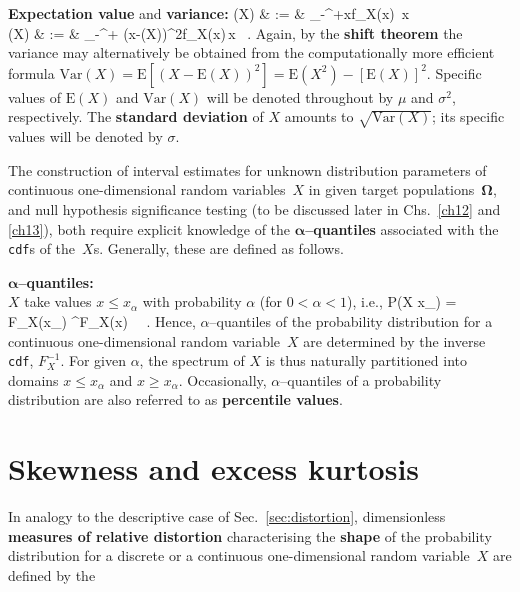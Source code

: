 \medskip
\noindent
\textbf{Expectation value} and \textbf{variance:}
%
\bea
{}
(X) & := & \int_{-\infty}^{+\infty}xf_{X}(x)\,
x \\
%
(X) & := & \int_{-\infty}^{+\infty}
\left(x-(X)\right)^{2}f_{X}(x)\,x \ .
\eea
%
Again, by the \textbf{shift theorem} the variance may alternatively 
be obtained from the computationally more efficient formula 
$\displaystyle \mathrm{Var}(X)=\mathrm{E}
\left[(X-\mathrm{E}(X))^{2}\right]
=\mathrm{E}(X^{2})-\left[\mathrm{E}(X)\right]^{2}$. Specific values
of $\mathrm{E}(X)$ and $\mathrm{Var}(X)$ will be denoted throughout
by $\mu$ and $\sigma^{2}$, respectively. The \textbf{standard
deviation} of $X$ amounts to $\sqrt{\mathrm{Var}(X)}$; its specific
values will be denoted by $\sigma$.

\medskip
\noindent
The construction of interval estimates for unknown distribution 
parameters of continuous one-dimensional random variables~$X$ in 
given target populations~$\boldsymbol{\Omega}$, and null hypothesis
significance testing (to be discussed later in 
Chs.~\ref{ch12} and \ref{ch13}), both require explicit knowledge of
the $\boldsymbol{\alpha}$\textbf{--quantiles} associated with the
\texttt{cdf}s of the~$X$s. Generally, these are defined as follows.

\medskip
\noindent
$\boldsymbol{\alpha}$\textbf{--quantiles:} \\
$X$ take values $x \leq x_{\alpha}$ with probability $\alpha$ 
(for $0<\alpha<1$), i.e.,
%
\be
P(X \leq x_{\alpha}) = F_{X}(x_{\alpha}) \stackrel{!}{=} 
\alpha
\qquad \overbrace{\Leftrightarrow}^{F_{X}(x)\ }\qquad
{} \ .
\ee
%
Hence, $\alpha$--quantiles of the probability distribution for a 
continuous one-dimensional random variable~$X$ are determined by 
the inverse \texttt{cdf}, $F_{X}^{-1}$. For given $\alpha$, the 
spectrum of $X$ is thus naturally partitioned into domains $x \leq 
x_{\alpha}$ and $x \geq x_{\alpha}$. Occasionally, 
$\alpha$--quantiles of a probability distribution are also 
referred to as \textbf{percentile values}.

\section[Skewness and excess kurtosis]{Skewness and excess 
kurtosis}
In analogy to the descriptive case of Sec.~\ref{sec:distortion},
dimensionless \textbf{measures of relative distortion}
characterising the \textbf{shape} of the probability distribution
for a discrete or a continuous one-dimensional random variable~$X$
are defined by the

